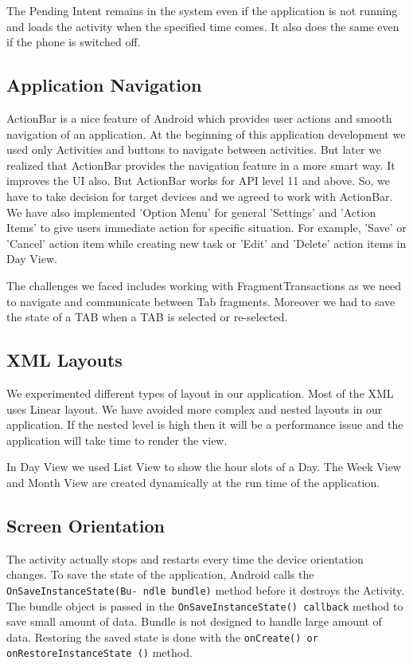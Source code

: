 \documentclass[10pt,a4paper]{report}
\begin{document}
The Pending Intent remains in the system even if the application is not running and loads the activity when the specified time comes. It also does the same even if the phone is switched off. 

\subsection{Application Navigation}

ActionBar is a nice feature of Android which provides user actions and smooth navigation of an application. At the beginning of this application development we used only Activities and buttons to navigate between activities. But later we realized that ActionBar provides the navigation feature in a more smart way. It improves the UI also. But ActionBar works for API level 11 and above. So, we have to take decision for target devices and we agreed to work with ActionBar. We have also implemented 'Option Menu' for general 'Settings' and 'Action Items' to give users immediate action for specific situation. For example, 'Save' or 'Cancel' action item while creating new task or 'Edit' and 'Delete' action items in Day View.

The challenges we faced includes working with FragmentTransactions as we need to navigate and communicate between Tab fragments. Moreover we had to save the state of a TAB when a TAB is selected or re-selected.

\subsection{XML Layouts}

We experimented different types of layout in our application. Most of the XML uses Linear layout. We have avoided more complex and nested layouts in our application. If the nested level is high then it will be a performance issue and the application will take time to render the view.

In Day View we used List View to show the hour slots of a Day. The Week View and Month View are created dynamically at the run time of the application.

\subsection{Screen Orientation}

The activity actually stops and restarts every time the device orientation changes. To save the state of the application, Android calls the \texttt{OnSaveInstanceState(Bu- ndle bundle)} method before it destroys the Activity. The bundle object is passed in the \texttt{OnSaveInstanceState() callback} method to save small amount of data. Bundle is not designed to handle large amount of data. Restoring the saved state is done with the \texttt{onCreate() or onRestoreInstanceState ()} method.
\end{document}
